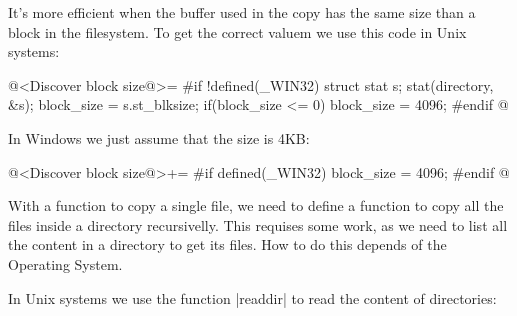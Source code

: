 It's more efficient when the buffer used in the copy has the same size
than a block in the filesystem. To get the correct valuem we use this
code in Unix systems:

\iniciocodigo
@<Discover block size@>=
#if !defined(_WIN32)
{
  struct stat s;
  stat(directory, &s);
  block_size = s.st_blksize;
  if(block_size <= 0){
    block_size = 4096;
  }
}
#endif
@
\fimcodigo

In Windows we just assume that the size is 4KB:

\iniciocodigo
@<Discover block size@>+=
#if defined(_WIN32)
  block_size = 4096;
#endif
@
\fimcodigo


With a function to copy a single file, we need to define a function to
copy all the files inside a directory recursivelly. This requises some
work, as we need to list all the content in a directory to get its
files. How to do this depends of the Operating System.

In Unix systems we use the function |readdir| to read the content of
directories:

